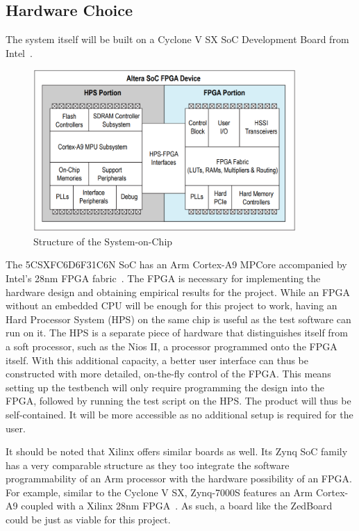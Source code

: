 \subsection{Hardware Choice}
The system itself will be built on a Cyclone V SX SoC Development Board from Intel~\cite{Intel1}.

\begin{figure}[H]
  \centering
  \includegraphics[width=10cm]{img/SoCStructure}
  \caption{Structure of the System-on-Chip}
  \label{SoCStructure}
\end{figure}

The 5CSXFC6D6F31C6N SoC has an Arm Cortex-A9 MPCore accompanied by Intel's 28nm FPGA fabric~\cite{Altera1}.
The FPGA is necessary for implementing the hardware design and obtaining empirical results for the project.
While an FPGA without an embedded CPU will be enough for this project to work, having an Hard Processor System (HPS) on the same chip is useful as the test software can run on it.
The HPS is a separate piece of hardware that distinguishes itself from a soft processor, such as the Nios II, a processor programmed onto the FPGA itself.
With this additional capacity, a better user interface can thus be constructed with more detailed, on-the-fly control of the FPGA.
This means setting up the testbench will only require programming the design into the FPGA, followed by running the test script on the HPS.
The product will thus be self-contained.
It will be more accessible as no additional setup is required for the user.

It should be noted that Xilinx offers similar boards as well.
Its Zynq SoC family has a very comparable structure as they too integrate the software programmability of an Arm processor with the hardware possibility of an FPGA.
For example, similar to the Cyclone V SX, Zynq-7000S features an Arm Cortex-A9
coupled with a Xilinx 28nm FPGA~\cite{Xilinx1}.
As such, a board like the ZedBoard~\cite{Xilinx2} could be just as viable for this project.

